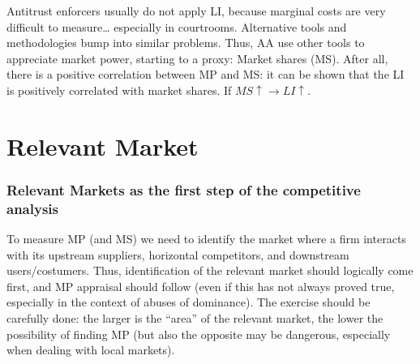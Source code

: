         Antitrust enforcers usually do not apply LI, because marginal costs are very difficult to measure… especially in courtrooms. Alternative tools and methodologies bump into similar problems. Thus, AA use other tools to appreciate market power, starting to a proxy: Market shares (MS). After all, there is a positive correlation between MP and MS: it can be shown that the LI is positively correlated with market shares. If \(MS \uparrow \rightarrow LI \uparrow\).


\section{Relevant Market}

        \subsubsection{Relevant Markets as the first step of the competitive analysis}

            To measure MP (and MS) we need to identify the market where a firm interacts with its upstream suppliers, horizontal competitors, and downstream users/costumers. Thus, identification of the relevant market should logically come first, and MP appraisal should follow (even if this has not always proved true, especially in the context of abuses of dominance). The exercise should be carefully done: the larger is the “area” of the relevant market, the lower the possibility of finding MP (but also the opposite may be dangerous, especially when dealing with local markets).



